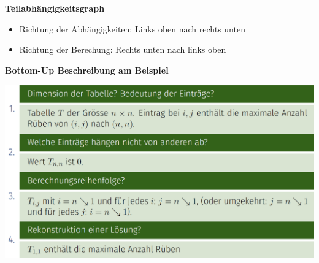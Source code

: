 \begin{sectionbox}
\textbf{Teilabhängigkeitsgraph}\par
\begin{itemize}
    \item Richtung der Abhängigkeiten: Links oben nach rechts unten
    \item Richtung der Berechung: Rechts unten nach links oben
\end{itemize}\vspace{7px}

\textbf{Bottom-Up Beschreibung am Beispiel}\par
\begin{center}
    \includegraphics[width = \columnwidth]{../img/kanTable.png}
\end{center}\smallskip

\end{sectionbox}



